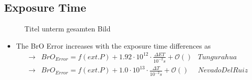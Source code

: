 \documentclass  [
  paper    = a4,
  BCOR     = 10mm,
  twoside,
  fontsize = 12pt,
  fleqn,
  toc      = bibnumbered,
  toc      = listofnumbered,
  numbers  = noendperiod,
  headings = normal,
  listof   = leveldown,
  version  = 3.03
]                                       {scrreprt}
\begin{document}
	\subsection{Exposure Time}
	\begin{figure}		
		\caption{Titel unterm gesamten Bild}
	\end{figure}
	\begin{itemize}
		\item The BrO Error increases with the exposure time differences as\\
		\begin{align*}
		\rightarrow&  BrO_{Error} = f(ext. P)+ 1.92\cdot10^{12}\cdot\frac{\Delta ET}{10^{-2}s} + \mathcal{O}\left(\right) & Tungurahua\\
		\rightarrow&  BrO_{Error} = f(ext. P)+ 1.0\cdot10^{13}\cdot\frac{\Delta T}{10^{-2}s} + \mathcal{O}\left(\right) & Nevado Del Ruiz\\
		\end{align*}
	\end{itemize}
\end{document}
